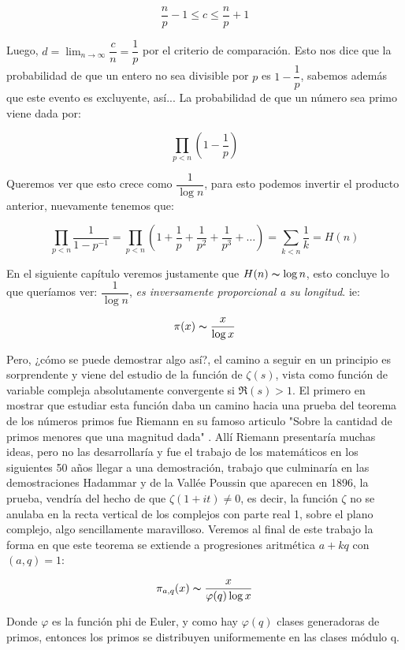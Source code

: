 $$\frac{n}{p}-1\leq c\leq\frac{n}{p}+1$$

Luego, $d=\displaystyle\lim_{n \to \infty}\dfrac{c}{n}=\dfrac{1}{p}$ por el criterio de comparación. Esto nos dice que la probabilidad de que un entero no sea divisible por $p$ es $1-\dfrac{1}{p}$, sabemos además que este evento es excluyente, así... La probabilidad de que un número sea primo viene dada por:

$$\displaystyle\prod_{p<n}\left( 1-\frac{1}{p} \right)$$

Queremos ver que esto crece como $\dfrac{1}{\log n}$, para esto podemos invertir el producto anterior, nuevamente tenemos que:

$$\prod_{p<n} \dfrac{1}{1-p^{-1}}=\prod_{p<n} \left(1+\dfrac{1}{p}+\dfrac{1}{p^2}+\dfrac{1}{p^3}+\ldots\right)=\sum_{k<n}\frac{1}{k}=H(n)$$

En el siguiente capítulo veremos justamente que $H(n)\thicksim \log n$, esto concluye lo que queríamos ver:  $\dfrac{1}{\log n}$, \textit{es inversamente proporcional a su longitud}. ie:

 $$\pi(x)\thicksim \dfrac{x}{\log x}$$

Pero, ¿cómo se puede demostrar algo así?, el camino a seguir en un principio es sorprendente y viene del estudio de la función de $\zeta(s)$, vista como función de variable compleja absolutamente convergente si $\Re(s)>1$. El primero en mostrar que estudiar esta función daba un camino hacia una prueba del teorema de los números primos fue Riemann en su famoso articulo "Sobre la cantidad de primos menores que una magnitud dada" \cite{riemann1990ueber}. Allí Riemann presentaría muchas ideas, pero no las desarrollaría y fue el trabajo de los matemáticos en los siguientes 50 años llegar a una demostración, trabajo que culminaría en las demostraciones Hadammar y de la Vallée Poussin que aparecen en 1896, la prueba, vendría del hecho de que $\zeta(1+it)\neq 0$, es decir, la función $\zeta$ no se anulaba en la recta vertical de los complejos con parte real 1, sobre el plano complejo, algo sencillamente maravilloso. Veremos al final de este trabajo la forma en que este teorema se extiende a progresiones aritmética $a+kq$ con $(a,q)=1$:

$$\pi_{a,q}(x)\thicksim \frac{x}{\varphi(q)\log x}$$

Donde $\varphi$ es la función phi de Euler, y como hay $\varphi(q)$ clases generadoras de primos, entonces los primos se distribuyen uniformemente en las clases módulo q.\\

